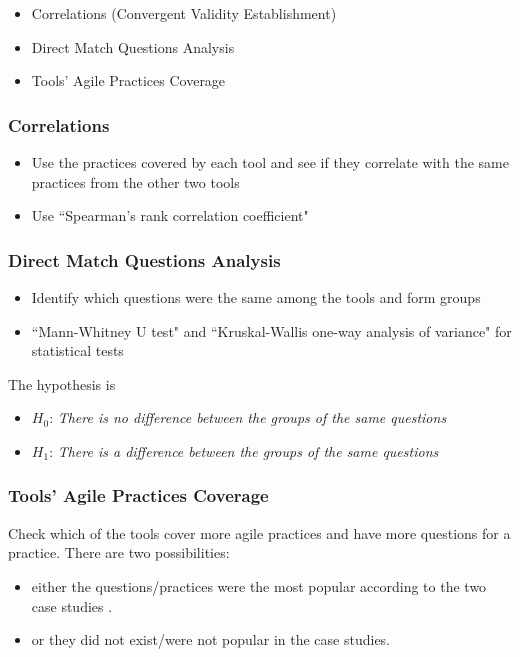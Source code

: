 \clearpage

\begin{itemize}
	\item Correlations ({\footnotesize Convergent Validity Establishment})
	\item Direct Match Questions Analysis
	\item Tools' Agile Practices Coverage
\end{itemize}

\clearpage

\subsubsection{Correlations}

\begin{itemize}
	\item Use the practices covered by each tool and see if they correlate with the same practices from the other two tools
	\item Use ``Spearman's rank correlation coefficient"
\end{itemize}

\clearpage

\subsubsection{Direct Match Questions Analysis}

\begin{itemize}
	\item Identify which questions were the same among the tools and form groups
	\item ``Mann-Whitney U test" and ``Kruskal-Wallis one-way analysis of variance" for statistical tests
\end{itemize}

The hypothesis is

\begin{itemize}[label={}]
	\item $H_0$: \textit{There is no difference between the groups of the same questions}
	\item $H_1$: \textit{There is a difference between the groups of the same questions}
\end{itemize}

\clearpage

\subsubsection{Tools' Agile Practices Coverage}

Check which of the tools cover more agile practices and have more questions for a practice. There are two possibilities:

\begin{itemize}
	\item either the questions/practices were the most popular according to the two case studies \cite{Williams_Microsoft, laurie_williams}.
	\item or they did not exist/were not popular in the case studies.
\end{itemize}

\clearpage